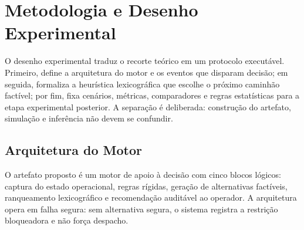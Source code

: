 \documentclass[
  12pt,
  oneside,
  a4paper,
  sumario=tradicional,
  brazil
]{abntex2}
\begin{document}
\chapter{Metodologia e Desenho Experimental}\label{ch:metodologia}
O desenho experimental traduz o recorte te\'orico em um protocolo execut\'avel. Primeiro, define a arquitetura do motor e os eventos que disparam decis\~ao; em seguida, formaliza a heur\'istica lexicogr\'afica que escolhe o pr\'oximo caminh\~ao fact\'ivel; por fim, fixa cen\'arios, m\'etricas, comparadores e regras estat\'isticas para a etapa experimental posterior. A separa\c{c}\~ao \'e deliberada: constru\c{c}\~ao do artefato, simula\c{c}\~ao e infer\^encia n\~ao devem se confundir.

\section{Arquitetura do Motor}\label{ch:artefato}
O artefato proposto \'e um motor de apoio \`a decis\~ao com cinco blocos l\'ogicos: captura do estado operacional, regras r\'igidas, gera\c{c}\~ao de alternativas fact\'iveis, ranqueamento lexicogr\'afico e recomenda\c{c}\~ao audit\'avel ao operador. A arquitetura opera em falha segura: sem alternativa segura, o sistema registra a restri\c{c}\~ao bloqueadora e n\~ao for\c{c}a despacho.
\end{document}
